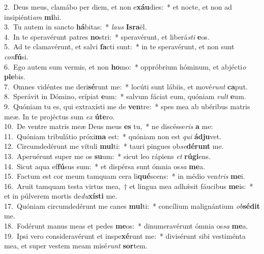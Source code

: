 {2.~}Deus meus, clamábo per diem, et non e\textbf{xáu}dies:~* et nocte, et non ad insipiénti\textit{am} \textbf{mi}hi.\\
{3.~}Tu autem in sancto \textbf{há}bitas:~* \textit{laus} \textbf{Is}\textbf{ra}ël.\\
{4.~}In te speravérunt patres \textbf{no}stri:~* speravérunt, et liberá\textit{sti} \textbf{e}os.\\
{5.~}Ad te clamavérunt, et salvi \textbf{fa}cti sunt:~* in te speravérunt, et non sunt \textit{con}\textbf{fú}si.\\
{6.~}Ego autem sum vermis, et non \textbf{ho}mo:~* oppróbrium hóminum, et abjécti\textit{o} \textbf{ple}bis.\\
{7.~}Omnes vidéntes me deri\textbf{sé}runt me:~* locúti sunt lábiis, et mové\textit{runt} \textbf{ca}put.\\
{8.~}Sperávit in Dómino, erípiat \textbf{e}um:~* salvum fáciat eum, quóniam \textit{vult} \textbf{e}um.\\
{9.~}Quóniam tu es, qui extraxísti me de \textbf{ven}tre:~* spes mea ab ubéribus matris meæ. In te projéctus sum \textit{ex} \textbf{ú}\textbf{te}ro.\\
{10.~}De ventre matris meæ Deus meus \textbf{es} tu,~* ne discésse\textit{ris} \textbf{a} me:\\
{11.~}Quóniam tribulátio próxi\textbf{ma} est:~* quóniam non est \textit{qui} \textbf{ád}\textbf{ju}vet.\\
{12.~}Circumdedérunt me vítuli \textbf{mul}ti:~* tauri pingues ob\textit{se}\textbf{dé}\textbf{runt} me.\\
{13.~}Aperuérunt super me os \textbf{su}um:~* sicut leo rápiens \textit{et} \textbf{rú}\textbf{gi}ens.\\
{14.~}Sicut aqua ef\textbf{fú}sus sum:~* et dispérsa sunt ómnia os\textit{sa} \textbf{me}a.\\
{15.~}Factum est cor meum tamquam cera li\textbf{qué}scens:~* in médio ven\textit{tris} \textbf{me}i.\\
{16.~}Aruit tamquam testa virtus mea,~† et lingua mea adhǽsit fáucibus \textbf{me}is:~* et in púlverem mortis de\textit{du}\textbf{xí}\textbf{sti} me.\\
{17.~}Quóniam circumdedérunt me canes \textbf{mul}ti:~* concílium malignántium \textit{ob}\textbf{sé}\textbf{dit} me.\\
{18.~}Fodérunt manus meas et pedes \textbf{me}os:~* dinumeravérunt ómnia os\textit{sa} \textbf{me}a.\\
{19.~}Ipsi vero consideravérunt et inspe\textbf{xé}runt me:~* divisérunt sibi vestiménta mea, et super vestem meam misé\textit{runt} \textbf{sor}tem.\\
